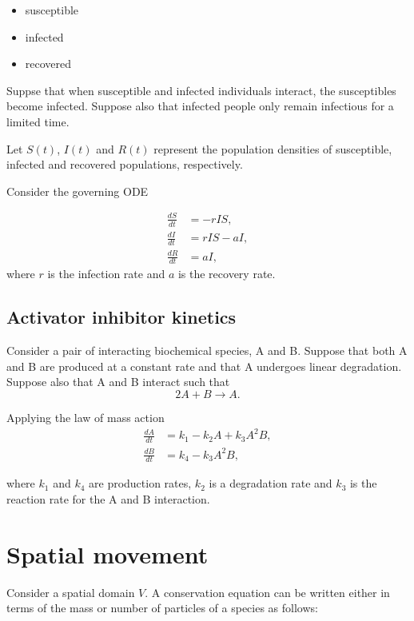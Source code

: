 \documentclass[
  letterpaper,
  DIV=11,
  numbers=noendperiod]{scrreprt}
\providecommand{\tightlist}{%
  \setlength{\itemsep}{0pt}\setlength{\parskip}{0pt}}\usepackage{longtable,booktabs,array}
\theoremstyle{plain}
\theoremstyle{definition}
\theoremstyle{plain}
\theoremstyle{remark}
\begin{document}
\begin{itemize}
\tightlist
\item
  susceptible
\item
  infected
\item
  recovered
\end{itemize}

Suppse that when susceptible and infected individuals interact, the
susceptibles become infected. Suppose also that infected people only
remain infectious for a limited time.

Let \(S(t)\), \(I(t)\) and \(R(t)\) represent the population densities
of susceptible, infected and recovered populations, respectively.

Consider the governing ODE

\[
\begin{aligned}
\frac{d S}{ dt} &= -rIS, \\
\frac{d I}{ dt} &= rIS - aI, \\
\frac{d R}{ dt} &= aI,
\end{aligned}
\] where \(r\) is the infection rate and \(a\) is the recovery rate.

\hypertarget{activator-inhibitor-kinetics}{%
\subsection{Activator inhibitor
kinetics}\label{activator-inhibitor-kinetics}}

Consider a pair of interacting biochemical species, A and B. Suppose
that both A and B are produced at a constant rate and that A undergoes
linear degradation. Suppose also that A and B interact such that \[
2A+B \rightarrow A.
\]

Applying the law of mass action \[
\begin{aligned}
\frac{d A}{ dt} &= k_1 - k_2 A + k_3 A^2 B,  \\
\frac{d B}{ dt} &= k_4 - k_3 A^2 B,
\end{aligned}
\]

where \(k_1\) and \(k_4\) are production rates, \(k_2\) is a degradation
rate and \(k_3\) is the reaction rate for the A and B interaction.

\hypertarget{spatial-movement}{%
\section{Spatial movement}\label{spatial-movement}}

Consider a spatial domain \(V\). A conservation equation can be written
either in terms of the mass or number of particles of a species as
follows:
\end{document}
